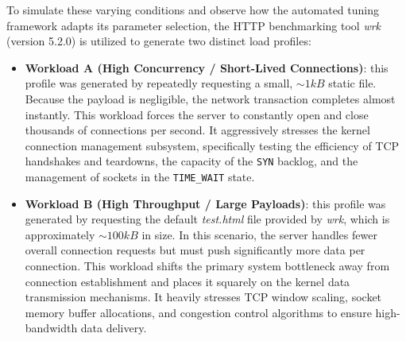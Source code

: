 To simulate these varying conditions and observe how the automated tuning framework adapts its parameter selection, the HTTP benchmarking tool \textit{wrk} (version 5.2.0) is utilized to generate two distinct load profiles:
\begin{itemize}
    \item \textbf{Workload A (High Concurrency / Short-Lived Connections)}: this profile was generated by repeatedly requesting a small, $\sim 1kB$ static file. Because the payload is negligible, the network transaction completes almost instantly. This workload forces the server to constantly open and close thousands of connections per second. It aggressively stresses the kernel connection management subsystem, specifically testing the efficiency of TCP handshakes and teardowns, the capacity of the \texttt{SYN} backlog, and the management of sockets in the \texttt{TIME\_WAIT} state.
    \item \textbf{Workload B (High Throughput / Large Payloads)}: this profile was generated by requesting the default \textit{test.html} file provided by \textit{wrk}, which is approximately $\sim 100kB$ in size. In this scenario, the server handles fewer overall connection requests but must push significantly more data per connection. This workload shifts the primary system bottleneck away from connection establishment and places it squarely on the kernel data transmission mechanisms. It heavily stresses TCP window scaling, socket memory buffer allocations, and congestion control algorithms to ensure high-bandwidth data delivery.
\end{itemize}

\newpage
